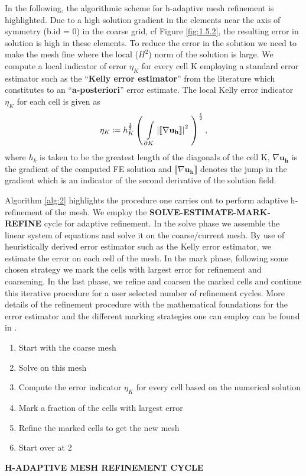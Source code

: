 In the following, the algorithmic scheme for h-adaptive mesh refinement is highlighted. Due to a high solution gradient in the elements near the axis of symmetry (b.id = 0) in the coarse grid, cf Figure \eqref{fig:1.5.2}, the resulting error in solution is high in these elements. To reduce the error in the solution we need to make the mesh fine where the local ($H^2$) norm of the solution is large. We compute a local indicator of error $\eta_K$ for every cell K employing a standard error estimator such as the ``\textbf{Kelly error estimator}'' from the literature \cite{Kelly1983} which constitutes to an ``\textbf{a-posteriori}'' error estimate. The local Kelly error indicator $\eta_K$ for each cell is given as 
\begin{equation}
\eta_K \coloneqq h_K^{\frac{1}{2}} \left( \ \int\limits_{\partial K} \seminorm{{\llbracket\nabla \mathbf{u_h} \rrbracket}}^2 \ \right)^\frac{1}{2},
\label{eq:1.27}
\end{equation}
where $h_k$ is taken to be the greatest length of the diagonals of the cell K, $\nabla \mathbf{u_h}$ is the gradient of the computed FE solution and $\llbracket\nabla \mathbf{u_h} \rrbracket$ denotes the jump in the gradient which is an indicator of the second derivative of the solution field. \par 

Algorithm \eqref{alg:2} highlights the procedure one carries out to perform adaptive h-refinement of the mesh. We employ the \textbf{SOLVE-ESTIMATE-MARK-REFINE} cycle for adaptive refinement. In the solve phase we assemble the linear system of equations and solve it on the coarse/current mesh. By use of heuristically derived error estimator such as the Kelly error estimator, we estimate the error on each cell of the mesh. In the mark phase, following some chosen strategy we mark the cells with largest error for refinement and coarsening. In the last phase, we refine and coarsen the marked cells and continue this iterative procedure for a user selected number of refinement cycles. More details of the refinement procedure with the mathematical foundations for the error estimator and the different marking strategies one can employ can be found in \cite[Chapter 4]{Gholap_project}. \par 

\begin{algorithm}[h]
\begin{enumerate}
\item Start with the coarse mesh
\item Solve on this mesh
\item Compute the error indicator $\eta_K$ for every cell based on the numerical solution
\item Mark a fraction of the cells with largest error
\item Refine the marked cells to get the new mesh
\item Start over at 2
\end{enumerate}
\caption{\textbf{H-ADAPTIVE MESH REFINEMENT CYCLE}}
\label{alg:2} 
\end{algorithm}

